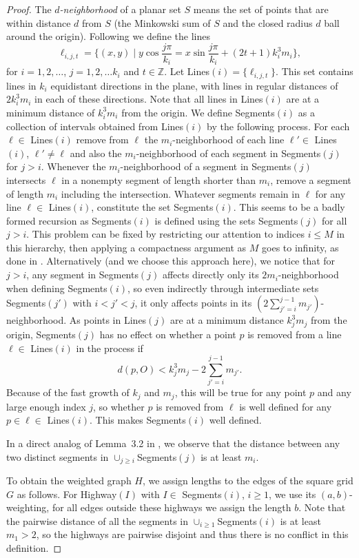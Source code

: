 \documentclass[12pt]{article}
\theoremstyle{plain}
\theoremstyle{definition}
\theoremstyle{remark}
\newcommand{\ZZ}{{\mathbb Z}}
\begin{document}
\begin{proof}
The \emph{$d$-neighborhood} of a planar set $S$ means the set of points that are within distance $d$ from $S$ (the Minkowski sum of $S$ and the closed radius $d$ ball around the origin). Following \cite{CaC26} we define the lines
$$\ell_{i,j,t}=\{(x,y)\mid y\cos\frac{j\pi}{k_i}=x\sin\frac{j\pi}{k_i}+(2t+1)k_i^3m_i\},$$
for $i=1,2,\dots$, $j=1,2,\dots k_i$ and $t\in\ZZ$. Let Lines$(i)=\{\ell_{i,j,t}\}$. This set contains lines in $k_i$ equidistant directions in the plane, with lines in regular distances of $2k_i^3m_i$ in each of these directions. Note that all lines in Lines$(i)$ are at a minimum distance of $k_i^3m_i$ from the origin. We define Segments$(i)$ as a collection of intervals obtained from Lines$(i)$ by the following process. For each $\ell\in$ Lines$(i)$ remove from $\ell$ the $m_i$-neighborhood of each line $\ell'\in$ Lines$(i)$, $\ell'\ne\ell$ and also the $m_i$-neighborhood of each segment in Segments$(j)$ for $j>i$. Whenever the $m_i$-neighborhood of a segment in Segments$(j)$ intersects $\ell$ in a nonempty segment of length shorter than $m_i$, remove a segment of length $m_i$ including the intersection. Whatever segments remain in $\ell$ for any line $\ell\in$ Lines$(i)$, constitute the set Segments$(i)$. This seems to be a badly formed recursion as Segments$(i)$ is defined using the sets Segments$(j)$ for all $j>i$. This problem can be fixed by restricting our attention to indices $i\le M$ in this hierarchy, then applying a compactness argument as $M$ goes to infinity, as done in \cite{CaC26}. Alternatively (and we choose this approach here), we notice that for $j>i$, any segment in Segments$(j)$ affects directly only its $2m_i$-neighborhood when defining Segments$(i)$, so even indirectly through intermediate sets Segments$(j')$ with $i<j'<j$, it only affects points in its $(2\sum_{j'=i}^{j-1}m_{j'})$-neighborhood. As points in Lines$(j)$ are at a minimum distance $k_j^3m_j$ from the origin, Segments$(j)$ has no effect on whether a point $p$ is removed from a line $\ell\in$ Lines$(i)$ in the process if $$d(p,O)<k_j^3m_j-2\sum_{j'=i}^{j-1}m_{j'}.$$ Because of the fast growth of $k_j$ and $m_j$, this will be true for any point $p$ and any large enough index $j$, so whether $p$ is removed from $\ell$ is well defined for any $p\in\ell\in$ Lines$(i)$. This makes Segments$(i)$ well defined.

In a direct analog of Lemma~3.2 in \cite{CaC26}, we observe that the distance between any two distinct segments in $\cup_{j\ge i}$Segments$(j)$ is at least $m_i$.

To obtain the weighted graph $H$, we assign lengths to the edges of the square grid $G$ as follows. For Highway$(I)$ with $I\in$ Segments$(i)$, $i\ge1$, we use its $(a,b)$-weighting, for all edges outside these highways we assign the length $b$. Note that the pairwise distance of all the segments in $\cup_{i\ge1}$Segments$(i)$ is at least $m_1>2$, so the highways are pairwise disjoint and thus there is no conflict in this definition.


\end{proof}
\end{document}
